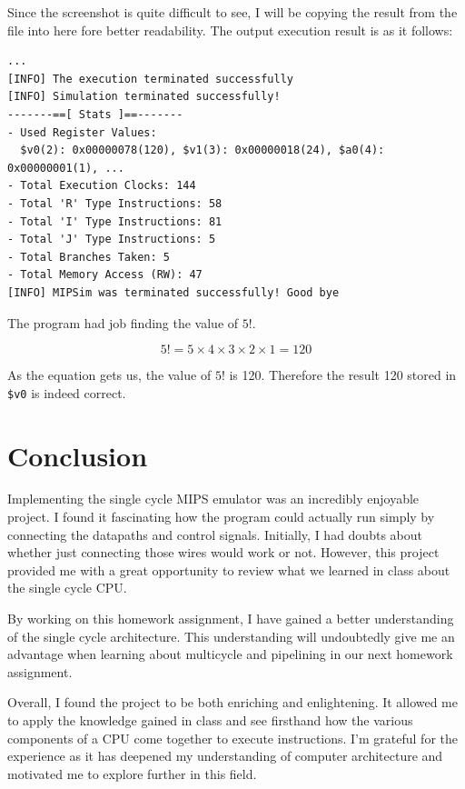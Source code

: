 \documentclass{homework}
\begin{document}
Since the screenshot is quite difficult to see, I will be copying the result from the file into here fore better readability. The output execution result is as it follows: 
\\
\begin{center}
\begin{code}
\begin{verbatim}
...
[INFO] The execution terminated successfully
[INFO] Simulation terminated successfully!
-------==[ Stats ]==-------
- Used Register Values:
  $v0(2): 0x00000078(120), $v1(3): 0x00000018(24), $a0(4): 0x00000001(1), ...
- Total Execution Clocks: 144
- Total 'R' Type Instructions: 58
- Total 'I' Type Instructions: 81
- Total 'J' Type Instructions: 5
- Total Branches Taken: 5
- Total Memory Access (RW): 47
[INFO] MIPSim was terminated successfully! Good bye
\end{verbatim}
\end{code}
\end{center}
The program had job finding the value of $5!$. 

\[
5! = 5 \times 4 \times 3 \times 2 \times 1 = 120
\]

As the equation gets us, the value of $5!$ is 120. Therefore the result 120 stored in \texttt{\$v0} is indeed correct.
\pagebreak



\pagebreak
\section{Conclusion}

Implementing the single cycle MIPS emulator was an incredibly enjoyable project. I found it fascinating how the program could actually run simply by connecting the datapaths and control signals. Initially, I had doubts about whether just connecting those wires would work or not. However, this project provided me with a great opportunity to review what we learned in class about the single cycle CPU.

By working on this homework assignment, I have gained a better understanding of the single cycle architecture. This understanding will undoubtedly give me an advantage when learning about multicycle and pipelining in our next homework assignment.

Overall, I found the project to be both enriching and enlightening. It allowed me to apply the knowledge gained in class and see firsthand how the various components of a CPU come together to execute instructions. I'm grateful for the experience as it has deepened my understanding of computer architecture and motivated me to explore further in this field.
\end{document}
